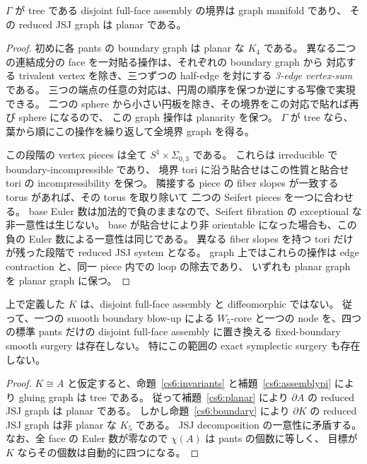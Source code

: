 \begin{lemma}
\label{cs6:planar}
$\Gamma$ が tree である disjoint full-face assembly の境界は graph manifold であり、
その reduced JSJ graph は planar である。
\end{lemma}

\begin{proof}
初めに各 pants の boundary graph は planar な $K_4$ である。
異なる二つの連結成分の face を一対貼る操作は、それぞれの boundary graph から
対応する trivalent vertex を除き、三つずつの half-edge を対にする
\emph{3-edge vertex-sum} である。
三つの端点の任意の対応は、円周の順序を保つか逆にする写像で実現できる。
二つの sphere から小さい円板を除き、その境界をこの対応で貼れば再び sphere になるので、
この graph 操作は planarity を保つ。
$\Gamma$ が tree なら、葉から順にこの操作を繰り返して全境界 graph を得る。

この段階の vertex pieces は全て $S^1\times\Sigma_{0,3}$ である。
これらは irreducible で boundary-incompressible であり、
境界 tori に沿う貼合せはこの性質と貼合せ tori の incompressibility を保つ。
隣接する piece の fiber slopes が一致する torus があれば、その torus を取り除いて
二つの Seifert pieces を一つに合わせる。
base Euler 数は加法的で負のままなので、Seifert fibration の exceptional な非一意性は生じない。
base が貼合せにより非 orientable になった場合も、この負の Euler 数による一意性は同じである。
異なる fiber slopes を持つ tori だけが残った段階で reduced JSJ system となる。
graph 上ではこれらの操作は edge contraction と、同一 piece 内での loop の除去であり、
いずれも planar graph を planar graph に保つ。
\end{proof}

\begin{theorem}
\label{cs6:nogo}
上で定義した $K$ は、disjoint full-face assembly と diffeomorphic ではない。
従って、一つの smooth boundary blow-up による
$W_5$-core と一つの node を、四つの標準 pants だけの
disjoint full-face assembly に置き換える fixed-boundary smooth surgery は存在しない。
特にこの範囲の exact symplectic surgery も存在しない。
\end{theorem}

\begin{proof}
$K\cong A$ と仮定すると、命題~\ref{cs6:invariants} と補題~\ref{cs6:assemblypi} により
gluing graph は tree である。
従って補題~\ref{cs6:planar} により $\partial A$ の reduced JSJ graph は planar である。
しかし命題~\ref{cs6:boundary} により $\partial K$ の reduced JSJ graph は非 planar な $K_5$ である。
JSJ decomposition の一意性に矛盾する。
なお、全 face の Euler 数が零なので $\chi(A)$ は pants の個数に等しく、
目標が $K$ ならその個数は自動的に四つになる。
\end{proof}

